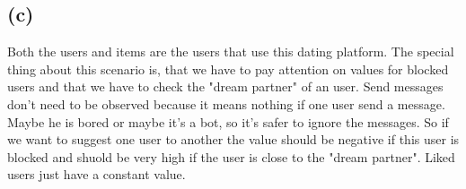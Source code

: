 \documentclass[11pt,a4paper]{scrartcl}
\begin{document}
\subsection*{(c)}

Both the users and items are the users that use this dating platform. The special thing about this scenario is, that we have to pay attention on values for blocked users and that we have to check the "dream partner" of an user. Send messages don't need to be observed because it means nothing if one user send a message. Maybe he is bored or maybe it's a bot, so it's safer to ignore the messages. So if we want to suggest one user to another the value should be negative if this user is blocked and shuold be very high if the user is close to the "dream partner". Liked users just have a constant value.
\end{document}
